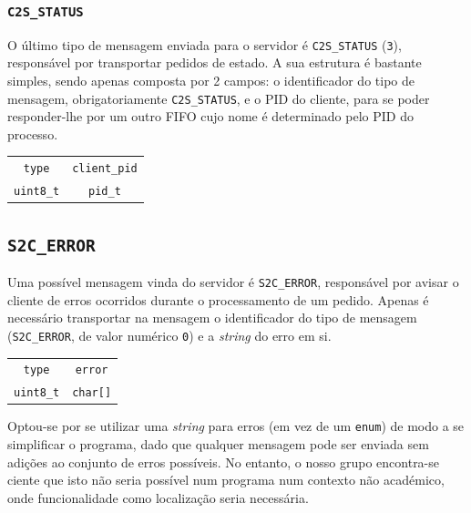 \documentclass[11pt]{article}
\begin{document}
\subsubsection{\texttt{C2S\_STATUS}}

O último tipo de mensagem enviada para o servidor é \texttt{C2S\_STATUS} (\texttt{3}), responsável
por transportar pedidos de estado. A sua estrutura é bastante simples, sendo apenas composta por 2
campos: o identificador do tipo de mensagem, obrigatoriamente \texttt{C2S\_STATUS}, e o PID do
cliente, para se poder responder-lhe por um outro FIFO cujo nome é determinado pelo PID do processo.

\begin{center}
    \begin{tabular}{|c|c|}
        \hline
            \texttt{type}     & \texttt{client\_pid} \\
            \texttt{uint8\_t} & \texttt{pid\_t}      \\
        \hline
    \end{tabular}
\end{center}

\subsection{\texttt{S2C\_ERROR}}

Uma possível mensagem vinda do servidor é \texttt{S2C\_ERROR}, responsável por avisar o cliente de
erros ocorridos durante o processamento de um pedido. Apenas é necessário transportar na mensagem o
identificador do tipo de mensagem (\texttt{S2C\_ERROR}, de valor numérico \texttt{0}) e a
\emph{string} do erro em si.

\begin{center}
    \begin{tabular}{|c|c|}
        \hline
            \texttt{type}     & \texttt{error}  \\
            \texttt{uint8\_t} & \texttt{char[]} \\
        \hline
    \end{tabular}
\end{center}

Optou-se por se utilizar uma \emph{string} para erros (em vez de um \texttt{enum}) de modo a se
simplificar o programa, dado que qualquer mensagem pode ser enviada sem adições ao conjunto de erros
possíveis. No entanto, o nosso grupo encontra-se ciente que isto não seria possível num programa
num contexto não académico, onde funcionalidade como localização seria necessária.
\end{document}
